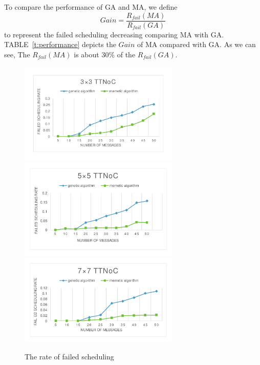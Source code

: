 \documentclass[journal]{IEEEtran}
\theoremstyle{remark}
\begin{document}
To compare the performance of GA and MA,
 we define
\begin{equation}
	Gain=\frac{R_{fail}(MA)}{R_{fail}(GA)}
\end{equation}
to represent the failed scheduling decreasing comparing MA with GA.
TABLE~\ref{t:performance} depicts the $Gain$ of MA compared with GA.
As we can see, The $R_{fail}(MA)$ is about 30\% of the $R_{fail}(GA)$.

\begin{figure}[!t]
	\centering
	\includegraphics[width=3in]{picture/33TTNOC}
		\includegraphics[width=3in]{picture/55TTNOC}
			\includegraphics[width=3in]{picture/77TTNOC}
	\caption{The rate of failed scheduling}
	\label{f:fail}
\end{figure}
\end{document}

